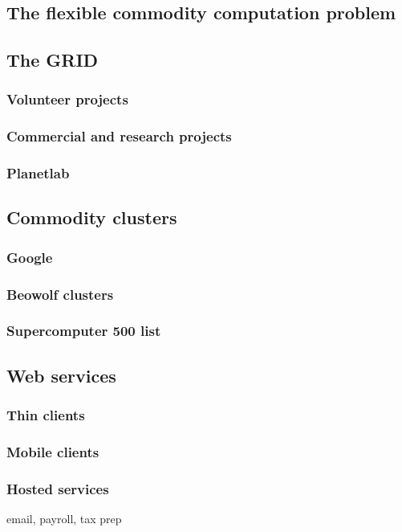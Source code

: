 \subsection{The flexible commodity computation problem}

\subsection{The GRID}
\subsubsection{Volunteer projects}
\subsubsection{Commercial and research projects}
\subsubsection{Planetlab}

\subsection{Commodity clusters}
\subsubsection{Google}
\subsubsection{Beowolf clusters}
\subsubsection{Supercomputer 500 list}

\subsection{Web services}
\subsubsection{Thin clients}
\subsubsection{Mobile clients}
\subsubsection{Hosted services}
email, payroll, tax prep

